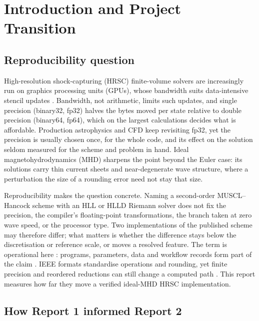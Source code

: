 
\chapter{Introduction and Project Transition}
\label{chap:introduction}

\section{Reproducibility question}

High-resolution shock-capturing (HRSC) finite-volume solvers are increasingly
run on graphics processing units (GPUs), whose bandwidth suits data-intensive
stencil updates \citep{bardDorelli2014gpu}. Bandwidth, not arithmetic, limits
such updates, and single precision (binary32, fp32) halves the bytes
moved per state relative to double precision (binary64, fp64), which on the
largest calculations decides what is affordable. Production astrophysics and
CFD keep revisiting fp32, yet the precision is usually chosen once,
for the whole code, and its effect on the solution seldom measured for the
scheme and problem in hand. Ideal magnetohydrodynamics (MHD) sharpens the point
beyond the Euler case: its solutions carry thin current sheets and
near-degenerate wave structure, where a perturbation the size of a rounding
error need not stay that size.

Reproducibility makes the question concrete. Naming a second-order
MUSCL--Hancock scheme with an HLL or HLLD Riemann solver does not fix the
precision, the compiler's floating-point transformations, the branch taken at
zero wave speed, or the processor type. Two implementations of the published
scheme may therefore differ; what matters is whether the difference stays below
the discretisation or reference scale, or moves a resolved feature. The term is
operational here \citep{plesser2018reproducibility}: programs,
parameters, data and workflow records form part of the claim
\citep{sandveEtAl2013reproducible}. IEEE formats standardise operations and
rounding, yet finite precision and reordered reductions can still change a
computed path
\citep{ieee7542019,goldberg1991floatingPoint,higham2002accuracy,
collangeEtAl2015reduction}. This report measures how far they move a verified
ideal-MHD HRSC implementation.

\section{How Report 1 informed Report 2}

